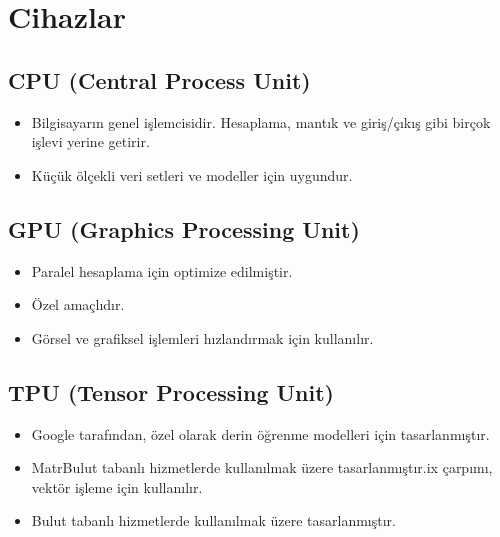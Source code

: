 \section{Cihazlar}
\subsection{CPU (Central Process Unit)}
\begin{itemize}
    \item Bilgisayarın genel işlemcisidir. Hesaplama, mantık ve giriş/çıkış gibi birçok işlevi yerine getirir.
    \item Küçük ölçekli veri setleri ve modeller için uygundur.
\end{itemize}

\subsection{GPU (Graphics Processing Unit)}
\begin{itemize}
    \item Paralel hesaplama için optimize edilmiştir.
    \item Özel amaçlıdır.
    \item Görsel ve grafiksel işlemleri hızlandırmak için kullanılır.
\end{itemize}

\subsection{TPU (Tensor Processing Unit)}
\begin{itemize}
    \item Google tarafından, özel olarak derin öğrenme modelleri için tasarlanmıştır.
    \item MatrBulut tabanlı hizmetlerde kullanılmak üzere tasarlanmıştır.ix çarpımı, vektör işleme için kullanılır.
    \item Bulut tabanlı hizmetlerde kullanılmak üzere tasarlanmıştır.
\end{itemize}

\newpage
